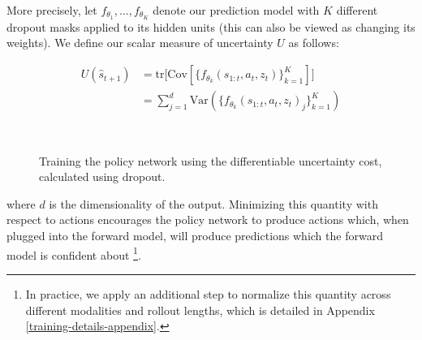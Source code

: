\documentclass{article} %
\begin{document}
    More precisely, let $f_{\theta_1}, ..., f_{\theta_K}$ denote our prediction model with $K$ different dropout masks applied to its hidden units (this can also be viewed as changing its weights). We define our scalar measure of uncertainty $U$ as follows:



    \begin{align*}
      U(\hat{s}_{t+1}) &= \mbox{tr} \Big[ \mbox{Cov} [\{ f_{\theta_k}(s_{1:t}, a_t, z_t) \}_{k=1}^K] \Big] \\
      &= \sum_{j=1}^d \mbox{Var}(\{ f_{\theta_k}(s_{1:t}, a_t, z_t)_j \}_{k=1}^K)
    \end{align*}



\begin{figure}[t!]
    \centering
     \\
    \label{planning-methods}
    \caption{Training the policy network using the differentiable uncertainty cost, calculated using dropout.}
\end{figure}




where $d$ is the dimensionality of the output. Minimizing this quantity with respect to actions encourages the policy network to produce actions which, when plugged into the forward model, will produce predictions which the forward model is confident about \footnote{In practice, we apply an additional step to normalize this quantity across different modalities and rollout lengths, which is detailed in Appendix \ref{training-details-appendix}.}.
\end{document}
